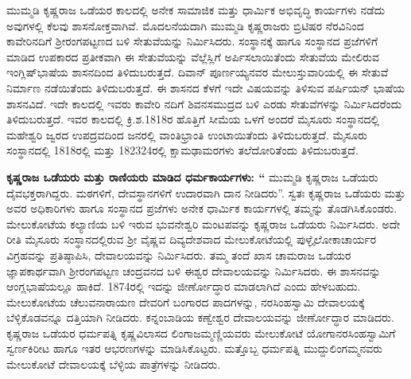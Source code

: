 ಮುಮ್ಮಡಿ ಕೃಷ್ಣರಾಜ ಒಡೆಯರ ಕಾಲದಲ್ಲಿ ಅನೇಕ ಸಾಮಾಜಿಕ ಮತ್ತು ಧಾರ್ಮಿಕ ಅಭಿವೃದ್ಧಿ ಕಾರ್ಯಗಳು ನಡೆದು ಅವುಗಳಲ್ಲಿ ಕೆಲವು ಶಾಸನೋಕ್ತವಾಗಿವೆ. ಮೊದಲನೆಯದಾಗಿ ಮುಮ್ಮಡಿ ಕೃಷ್ಣರಾಜರು ಬ್ರಿಟಿಷರ ನೆರವಿನಿಂದ ಕಾವೇರಿನದಿಗೆ ಶ‍್ರೀರಂಗಪಟ್ಟಣದ ಬಳಿ ಸೇತುವೆಯನ್ನು ನಿರ್ಮಿಸಿದರು. ಸಂಸ್ಥಾನಕ್ಕೆ ಹಾಗೂ ಸಂಸ್ಥಾನದ ಪ್ರಜೆಗಳಿಗೆ ಮಾಡಿದ ಉಪಕಾರದ ಪ್ರತೀಕವಾಗಿ ಈ ಸೇತುವೆಯನ್ನು ವೆಲ್ಲೆಸ್ಲಿಗೆ ಅರ್ಪಿಸಲಾಯಿತೆಂದು ಸೇತುವೆಯ ಮೇಲಿರುವ ಇಂಗ್ಲಿಷ್​ ಭಾಷೆಯ ಶಾಸನದಿಂದ ತಿಳಿದುಬರುತ್ತದೆ. ದಿವಾನ್​ ಪೂರ್ಣಯ್ಯನವರ ಮೇಲುಸ್ತುವಾರಿಯಲ್ಲಿ ಈ ಸೇತುವೆ ನಿರ್ಮಾಣ ನಡೆಯಿತೆಂದು ತಿಳಿದು\-ಬರುತ್ತದೆ. ಈ ಶಾಸನದ ಕೆಳಗೆ ಇದೇ ವಿಷಯವನ್ನು ತಿಳಿಸುವ ಪರ್ಷಿಯನ್​ ಭಾಷೆಯ ಶಾಸನವಿದೆ. ಇದೇ ಕಾಲದಲ್ಲಿ ಇವರು ಕಾವೇರಿ ನದಿಗೆ ಶಿವನಸಮುದ್ರದ ಬಳಿ ಎರಡು ಸೇತುವೆಗಳನ್ನು ನಿರ್ಮಿಸಿದರೆಂದು ತಿಳಿದುಬರುತ್ತದೆ. ಇವರ ಕಾಲದಲ್ಲಿ ಕ್ರಿ.ಶ.1818ರ ಹೊತ್ತಿಗೆ ಸೀಮೆಯ ಒಳಗೆ ಅಂದರೆ ಮೈಸೂರು ಸಂಸ್ಥಾನದಲ್ಲಿ ಮಹೇಶ್ವರಿ ಜ್ವರದ ಉಪದ್ರವದಿಂದ ಜನರಲ್ಲಿ ವಾಂತಿಭ್ರಾಂತಿ ಉಂಟಾಯಿತೆಂದು ತಿಳಿದುಬರುತ್ತದೆ. ಮೈಸೂರು ಸಂಸ್ಥಾನದಲ್ಲಿ 1818ರಲ್ಲಿ ಮತ್ತು 182324ರಲ್ಲಿ ಕ್ಷಾಮಢಾಮರಗಳು ತಲೆದೋರಿತೆಂದು ತಿಳಿದುಬರುತ್ತದೆ.

\textbf{ ಕೃಷ್ಣರಾಜ ಒಡೆಯರು ಮತ್ತು ರಾಣಿಯರು ಮಾಡಿದ ಧರ್ಮಕಾರ್ಯಗಳು: “} ಮುಮ್ಮಡಿ ಕೃಷ್ಣರಾಜ ಒಡೆಯರು ದೈವಭಕ್ತರಾಗಿದ್ದರು. ಮಠಗಳಿಗೆ, ದೇವಸ್ಥಾನಗಳಿಗೆ ಉದಾರವಾಗಿ ದಾನ ನೀಡಿದರು”. ಸ್ವತಃ ಕೃಷ್ಣರಾಜ ಒಡೆಯರು ಮತ್ತು ಅವರ ಅಧಿಕಾರಿಗಳು ಹಾಗೂ ಸಂಸ್ಥಾನದ ಪ್ರಜೆಗಳು ಅನೇಕ ಧಾರ್ಮಿಕ ಕಾರ್ಯಗಳಲ್ಲಿ ತಮ್ಮನ್ನು ತೊಡಗಿಸಿಕೊಂಡರು. ಮೇಲುಕೋಟೆಯ ಕಲ್ಯಾಣಿಯ ಬಳಿ ಇರುವ ಭುವನೇಶ್ವರಿ ಮಂಟಪವನ್ನು ಕೃಷ್ಣರಾಜ ಒಡೆಯರು ನಿರ್ಮಿಸಿದರು. ಅದೇ ರೀತಿ ಮೈಸೂರು ಸಂಸ್ಥಾನದಲ್ಲಿರುವ ಶ‍್ರೀ ವೈಷ್ಣವ ದಿವ್ಯದೇಶವಾದ ಮೇಲುಕೋಟೆಯಲ್ಲಿ ಪುಳ್ಳೈಲೋಕಾಚಾರ್ಯರ ವಿಗ್ರಹವನ್ನು ಪ್ರತಿಷ್ಠಾಪಿಸಿ, ದೇವಾಲಯವನ್ನು ನಿರ್ಮಿಸಿದರು. ತಮ್ಮ ತಂದೆ ಖಾಸ ಚಾಮರಾಜ ಒಡೆಯರ ಜ್ಞಾಪಕಾರ್ಥ\-ವಾಗಿ ಶ‍್ರೀರಂಗಪಟ್ಟಣ ಚಂದ್ರವನದ ಬಳಿ ಈಶ್ವರ ದೇವಾಲಯವನ್ನು ನಿರ್ಮಿಸಿದರು. ಈ ಶಾಸನವನ್ನು ಆಂಗ್ಲಭಾಷೆ\-ಯಲ್ಲೂ ಹಾಕಿದೆ. 1874ರಲ್ಲಿ ಇದನ್ನು ಜೀರ್ಣೋದ್ಧಾರ ಮಾಡಲಾಗಿದೆ ಎಂದು ಹೇಳಬಹುದು. ಮೇಲುಕೋಟೆಯ ಚೆಲುವನಾರಾಯಣ ದೇವರಿಗೆ ಬಂಗಾರದ ಪಾದಗಳನ್ನು, ನರಸಿಂಹಸ್ವಾಮಿ ದೇವಾಲಯಕ್ಕೆ ಬೆಳ್ಳಿಕೊಡವನ್ನೂ ದತ್ತಿಯಾಗಿ ನೀಡಿದರು. ಕನ್ನಂಬಾಡಿಯ ಕಣ್ವೇಶ್ವರ ದೇವಾಲಯವನ್ನು ಜೀರ್ಣೋದ್ಧಾರ ಮಾಡಿದರು. ಕೃಷ್ಣರಾಜ ಒಡೆಯರ ಧರ್ಮಪತ್ನಿ ಕೃಷ್ಣವಿಲಾಸದ ಲಿಂಗಾಜಮ್ಮಣ್ಣಿಯವರು ಮೇಲುಕೋಟೆ ಯೋಗಾನರಸಿಂಹಸ್ವಾಮಿಗೆ ಸ್ವರ್ಣಕಿರೀಟ ಹಾಗೂ ಇತರ ಆಭರಣಗಳನ್ನು ಮಾಡಿಸಿಕೊಟ್ಟರು. ಮತ್ತೊಬ್ಬ ಧರ್ಮಪತ್ನಿ ಮುದ್ದುಲಿಂಗಮ್ಮನವರು ಮೇಲುಕೋಟೆ ದೇವಾಲಯಕ್ಕೆ ಬೆಳ್ಳಿಯ ಪಾತ್ರೆಗಳನ್ನು ನೀಡಿದರು.

